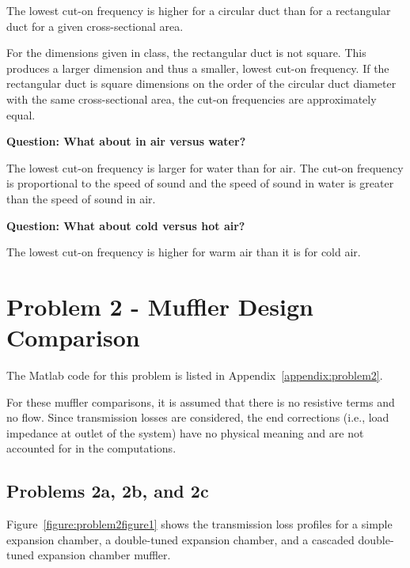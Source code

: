  The lowest cut-on frequency is higher for a circular duct than for a
 rectangular duct for a given cross-sectional area.

 For the dimensions given in class, the rectangular duct is not square.
 This produces a larger dimension and thus a smaller, lowest cut-on
 frequency.  If the rectangular duct is square dimensions on the order
 of the circular duct diameter with the same cross-sectional area, the
 cut-on frequencies are approximately equal.



\vspace{0.25cm}
\textbf{Question:  What about in air versus water?}

 The lowest cut-on frequency is larger for water than for air.  The cut-on
 frequency is proportional to the speed of sound and the speed of sound in
 water is greater than the speed of sound in air.



\vspace{0.25cm}
\textbf{Question:  What about cold versus hot air?}

 The lowest cut-on frequency is higher for warm air than it is for cold air.









\newpage
\section*{Problem 2 - Muffler Design Comparison}

The Matlab code for this problem is listed in Appendix~\ref{appendix:problem2}.

For these muffler comparisons, it is assumed that there is no resistive terms and no flow.  Since transmission losses are considered, the end corrections (i.e., load impedance at outlet of the system) have no physical meaning and are not accounted for in the computations.


\vspace{-0.25cm}
\subsection*{Problems 2a, 2b, and 2c}

\vspace{-0.25cm}
Figure~\ref{figure:problem2figure1} shows the transmission loss profiles for a simple expansion chamber, a double-tuned expansion chamber, and a cascaded double-tuned expansion chamber muffler.

